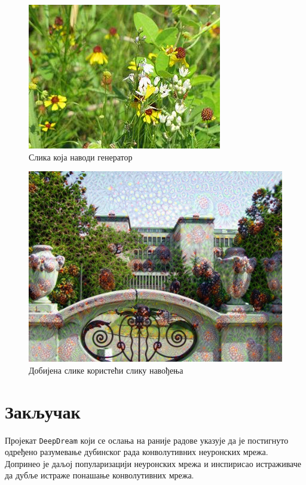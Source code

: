 \documentclass[a4paper]{article}
\begin{document}
\begin{figure}[h!]
\begin{center}
    \includegraphics[scale=0.5]{./resources/flowers.jpeg}
\end{center}
\caption{Слика која наводи генератор}
\label{fig:dreamgenerator}
\end{figure}

\begin{figure}[h!]
\begin{center}
    \includegraphics[width=\textwidth]{./resources/matfFlowers.jpeg}
\end{center}
\caption{Добијена слике користећи слику навођења}
\label{fig:dreamgeneratedresult}
\end{figure}

\section{Закључак}
Пројекат \texttt{DeepDream} који се ослања на раније радове \cite{visualizeCovnet, visualizeCovnet1,
visualizeCovnet3, visualizeCovnet4} указује да је постигнуто одређено разумевање
дубинског рада конволутивних неуронских мрежа. Допринео је даљој популаризацији неуронских мрежа и инспирисао
истраживаче да дубље истраже понашање конволутивних мрежа.
\end{document}
